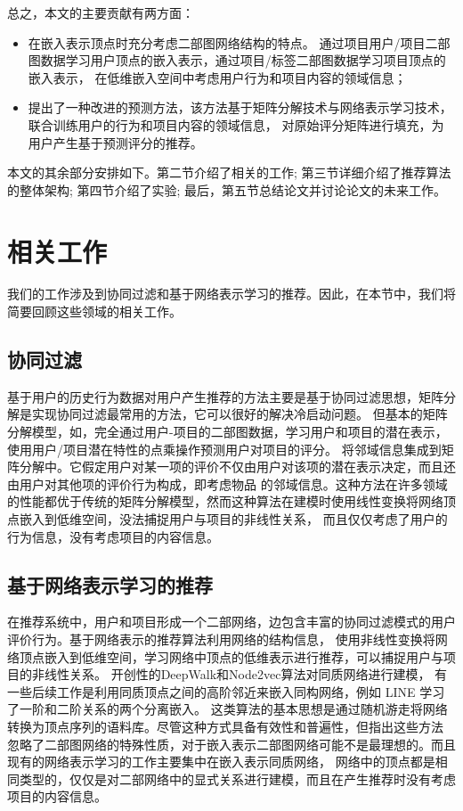 \documentclass[lang=cn,11pt]{elegantpaper}
\begin{document}
总之，本文的主要贡献有两方面：
\begin{itemize}
    \item 在嵌入表示顶点时充分考虑二部图网络结构的特点。
    通过项目用户/项目二部图数据学习用户顶点的嵌入表示，通过项目/标签二部图数据学习项目顶点的嵌入表示，
    在低维嵌入空间中考虑用户行为和项目内容的领域信息；
	
    \item 提出了一种改进的预测方法，该方法基于矩阵分解技术与网络表示学习技术，联合训练用户的行为和项目内容的领域信息，
    对原始评分矩阵进行填充，为用户产生基于预测评分的推荐。
\end{itemize}

本文的其余部分安排如下。第二节介绍了相关的工作; 第三节详细介绍了推荐算法的整体架构; 第四节介绍了实验; 最后，第五节总结论文并讨论论文的未来工作。

\section{相关工作}

我们的工作涉及到协同过滤和基于网络表示学习的推荐。因此，在本节中，我们将简要回顾这些领域的相关工作。

\subsection{协同过滤}

基于用户的历史行为数据对用户产生推荐的方法主要是基于协同过滤思想\cite{Su2009}，矩阵分解是实现协同过滤最常用的方法，它可以很好的解决冷启动问题\cite{Qiu2011}。
但基本的矩阵分解模型，如\cite{Salakhutdinov2007,Koren2009}，完全通过用户-项目的二部图数据，学习用户和项目的潜在表示，使用用户/项目潜在特性的点乘操作预测用户对项目的评分。
\cite{Koren2008}将邻域信息集成到矩阵分解中。它假定用户对某一项的评价不仅由用户对该项的潜在表示决定，而且还由用户对其他项的评价行为构成，即考虑物品
的邻域信息。这种方法在许多领域的性能都优于传统的矩阵分解模型，然而这种算法在建模时使用线性变换将网络顶点嵌入到低维空间，没法捕捉用户与项目的非线性关系，
而且仅仅考虑了用户的行为信息，没有考虑项目的内容信息。

\subsection{基于网络表示学习的推荐}

在推荐系统中，用户和项目形成一个二部网络，边包含丰富的协同过滤模式的用户评价行为\cite{He2017a}。基于网络表示的推荐算法利用网络的结构信息，
使用非线性变换将网络顶点嵌入到低维空间，学习网络中顶点的低维表示进行推荐\cite{Pongnumkul2018,Liu2009}，可以捕捉用户与项目的非线性关系。
开创性的DeepWalk\cite{Perozzi2014}和Node2vec\cite{Grover2016}算法对同质网络进行建模，
有一些后续工作是利用同质顶点之间的高阶邻近来嵌入同构网络，例如 LINE \cite{Tang2015}学习了一阶和二阶关系的两个分离嵌入。
这类算法的基本思想是通过随机游走将网络转换为顶点序列的语料库。尽管这种方式具备有效性和普遍性，但\cite{Gao2018}指出这些方法
忽略了二部图网络的特殊性质，对于嵌入表示二部图网络可能不是最理想的。而且现有的网络表示学习的工作主要集中在嵌入表示同质网络，
网络中的顶点都是相同类型的\cite{Grover2016,Perozzi2014,Liao2018}，仅仅是对二部网络中的显式关系进行建模，而且在产生推荐时没有考虑项目的内容信息。
\end{document}
